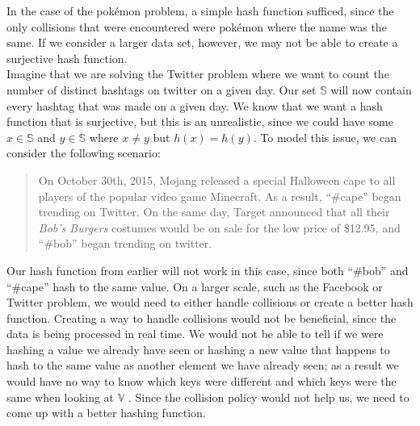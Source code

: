 \documentclass{article}
\begin{document}
In the case of the pok\'emon problem, a simple hash function sufficed, since the only collisions that were encountered were pok\'emon where the name was the same. 
If we consider a larger data set, however, we may not be able to create a surjective hash function.\\
\indent Imagine that we are solving the Twitter problem where we want to count the number of distinct hashtags on twitter on a given day. 
Our set $\mathbb{S}$ will now contain every hashtag that was made on a given day. 
We know that we want a hash function that is surjective, but this is an unrealistic, since we could have some $x \in \mathbb{S}$ and $y\in\mathbb{S}$ where $x \neq y$ but $h(x) = h(y)$. 
To model this issue, we can consider the following scenario:
\begin{quote}
On October 30th, 2015, Mojang released a special Halloween cape to all players of the popular video game Minecraft. 
As a result, ``\#cape'' began trending on Twitter.
On the same day, Target announced that all their \textit{Bob's Burgers} costumes would be on sale for the low price of \$12.95, and ``\#bob'' began trending on twitter.
\end{quote}  \clearpage
Our hash function from earlier will not work in this case, since both ``\#bob'' and ``\#cape'' hash to the same value. 
On a larger scale, such as the Facebook or Twitter problem, we would need to either handle collisions or create a better hash function. 
Creating a way to handle collisions would not be beneficial, since the data is being processed in real time. 
We would not be able to tell if we were hashing a value we already have seen or hashing a new value that happens to hash to the same value as another element we have already seen; as a result we would have no way to know which keys were different and which keys were the same when looking at $\mathbb{V}$ \cite[p. 6]{Maurer}. 
Since the collision policy would not help us, we need to come up with a better hashing function.\\
\end{document}
